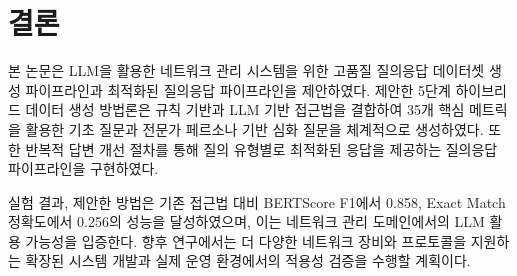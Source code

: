 \documentclass[twocolumn, 10pt]{article}
\begin{document}
\section{결론}

본 논문은 LLM을 활용한 네트워크 관리 시스템을 위한 고품질 질의응답 데이터셋 생성
파이프라인과 최적화된 질의응답 파이프라인을 제안하였다. 제안한 5단계
하이브리드 데이터 생성 방법론은 규칙 기반과 LLM 기반 접근법을 결합하여 35개
핵심 메트릭을 활용한 기초 질문과 전문가 페르소나 기반 심화 질문을 체계적으로
생성하였다. 또한 반복적 답변 개선 절차를 통해 질의 유형별로 최적화된 응답을 제공하는
질의응답 파이프라인을 구현하였다.

실험 결과, 제안한 방법은 기존 접근법 대비 BERTScore F1에서 0.858, Exact Match 정확도에서
0.256의 성능을 달성하였으며, 이는 네트워크 관리 도메인에서의 LLM 활용 가능성을
입증한다. 향후 연구에서는 더 다양한 네트워크 장비와 프로토콜을 지원하는 확장된
시스템 개발과 실제 운영 환경에서의 적용성 검증을 수행할 계획이다.



\end{document}
